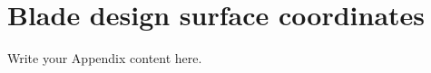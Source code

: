 
\chapter{Blade design surface coordinates} %

\label{r67_coords_data} %


Write your Appendix content here.
\cite{Light1}
\cite{Light2}
\cite{curle}
\cite{FWH}
\cite{bladecompose}
\cite{r67design}
\cite{r67performance}
\cite{r67laser}

